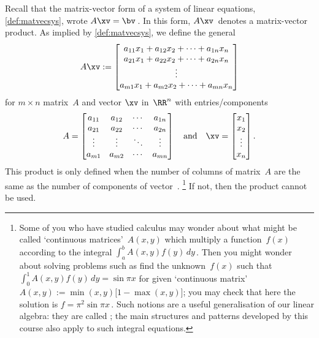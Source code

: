 Recall that the matrix-vector form of a system of linear equations, \autoref{def:matvecsys}, wrote \(A\xv=\bv\)\,.  
In this form, \(A\xv\)~denotes a matrix-vector product.
As implied by \autoref{def:matvecsys}, we define the general  
\begin{equation*}
A\xv:=
\begin{bmatrix} a_{11}x_1+a_{12}x_2+\cdots+a_{1n}x_n
\\a_{21}x_1+a_{22}x_2+\cdots+a_{2n}x_n
\\\vdots
\\a_{m1}x_1+a_{m2}x_2+\cdots+a_{mn}x_n
\end{bmatrix}
\end{equation*}
for \(m\times n\) matrix~\(A\) and vector \(\xv\) in~\(\RR^n\) with entries\slash components
\begin{equation*}
A=\begin{bmatrix} a_{11}&a_{12}&\cdots&a_{1n}
\\a_{21}&a_{22}&\cdots&a_{2n}
\\\vdots&\vdots&\ddots&\vdots
\\a_{m1}&a_{m2}&\cdots&a_{mn} \end{bmatrix}
\quad\text{and}\quad
\xv=\begin{bmatrix} x_1\\x_2\\\vdots\\x_n \end{bmatrix}.
\end{equation*}
This product is only defined when the number of columns of matrix~\(A\) are the same as the number of components of vector~\xv.
\footnote{Some of you who have studied calculus may wonder about what might be called `continuous matrices'~\(A(x,y)\) which multiply a function~\(f(x)\) according to the integral \(\int_a^b A(x,y)f(y)\,dy\)\,.  
Then you might wonder about solving problems such as find the unknown~\(f(x)\) such that \(\int_0^1 A(x,y)f(y)\,dy=\sin\pi x\) for given `continuous matrix' \(A(x,y):=\min(x,y)\big[1-\max(x,y)\big]\); 
you may check that here the solution is \(f=\pi^2\sin\pi x\)\,.
Such notions are a useful generalisation of our linear algebra: they are called ; the main structures and patterns developed by this course also apply to such integral equations.}
If not, then the product cannot be used.

